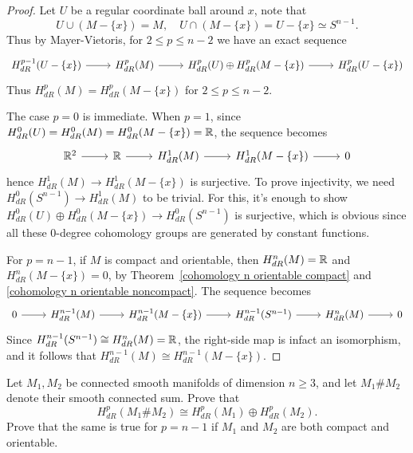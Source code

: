 \begin{proof}
Let $U$ be a regular coordinate ball around $x$, note that
\[U\cup(M-\{x\})=M,\quad U\cap(M-\{x\})=U-\{x\}\simeq S^{n-1}.\]
Thus by Mayer-Vietoris, for $2\leq p\leq n-2$ we have an exact sequence
\[\begin{tikzcd}
H^{p-1}_{dR}(U-\{x\})\ar[r]&H^p_{dR}(M)\ar[r]&H^p_{dR}(U)\oplus H^p_{dR}(M-\{x\})\ar[r]&H^p_{dR}(U-\{x\})
\end{tikzcd}\]
Thus $H^p_{dR}(M)=H^p_{dR}(M-\{x\})$ for $2\leq p\leq n-2$.\par
The case $p=0$ is immediate. When $p=1$, since $H^0_{dR}(U)=H^0_{dR}(M)=H^0_{dR}(M-\{x\})=\mathbb{R}$, the sequence becomes
\[\begin{tikzcd}
\R^2\ar[r]&\R\ar[r]&H^1_{dR}(M)\ar[r]&H^1_{dR}(M-\{x\})\ar[r]&0
\end{tikzcd}\]
hence $H^1_{dR}(M)\to H^1_{dR}(M-\{x\})$ is surjective. To prove injectivity, we need $H^0_{dR}(S^{n-1})\to H^1_{dR}(M)$ to be trivial. For this, it's enough to show $H^0_{dR}(U)\oplus H^0_{dR}(M-\{x\})\to H^0_{dR}(S^{n-1})$ is surjective, which is obvious since all these $0$-degree cohomology groups are generated by constant functions.\par
For $p=n-1$, if $M$ is compact and orientable, then $H^n_{dR}(M)=\mathbb{R}$ and $H^n_{dR}(M-\{x\})=0$, by Theorem~\ref{cohomology n orientable compact} and \ref{cohomology n orientable noncompact}. The sequence becomes
\[\begin{tikzcd}
0\ar[r]&H^{n-1}_{dR}(M)\ar[r]&H^{n-1}_{dR}(M-\{x\})\ar[r]&H^{n-1}_{dR}(S^{n-1})\ar[r]&H^n_{dR}(M)\ar[r]&0
\end{tikzcd}\]
Since $H^{n-1}_{dR}(S^{n-1})\cong H^n_{dR}(M)=\mathbb{R}$, the right-side map is infact an isomorphism, and it follows that $H^{n-1}_{dR}(M)\cong H^{n-1}_{dR}(M-\{x\})$.
\end{proof}
\begin{exercise}
Let $M_1,M_2$ be connected smooth manifolds of dimension $n\geq 3$, and let $M_1\#M_2$ denote their smooth connected sum. Prove that 
\[H^p_{dR}(M_1\#M_2)\cong H^p_{dR}(M_1)\oplus H^p_{dR}(M_2).\] 
Prove that the same is true for $p=n-1$ if $M_1$ and $M_2$ are both compact and orientable.
\end{exercise}
